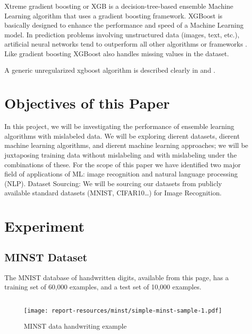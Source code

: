 \documentclass{article}
\begin{document}
Xtreme gradient boosting or XGB is a decision-tree-based ensemble Machine Learning algorithm that uses a gradient boosting framework. XGBoost is basically designed to enhance the performance and speed of a Machine Learning model. In prediction problems involving unstructured data (images, text, etc.), artificial neural networks tend to outperform all other algorithms or frameworks \cite{mujtaba_2021}. Like gradient boosting XGBoost also handles missing values in the dataset.  

A generic unregularized xgboost algorithm is described clearly in \cite{enwiki:1035329027} and \cite{morde_2019}. 

\section{Objectives of this Paper}

In this project, we will be investigating the performance of ensemble learning algorithms with mislabeled data. We will be exploring dierent datasets, dierent machine learning algorithms, and dierent machine learning approaches; we will be juxtaposing training data without mislabeling and with mislabeling under the combinations of these.  
For the scope of this paper we have identified two major field of applications of ML: image recognition and natural language processing (NLP). 
Dataset Sourcing:
We will be sourcing our datasets from publicly available standard datasets (MNIST, CIFAR10…) for Image Recognition.


\section{Experiment}

\subsection{MINST Dataset \cite{enwiki:1039756601}}

The MNIST database of handwritten digits, available from this page, has a training set of 60,000 examples, and a test set of 10,000 examples. 

\inputminted[firstline=16,lastline=20,frame=single,framesep=10pt,fontsize=\footnotesize]{python}{minst/main.py}

\begin{figure}[H]
    \centering
    \texttt{[image: report-resources/minst/simple-minst-sample-1.pdf]}
    \caption{MINST data handwriting example}
    \label{fig:let1}
\end{figure}
\end{document}
